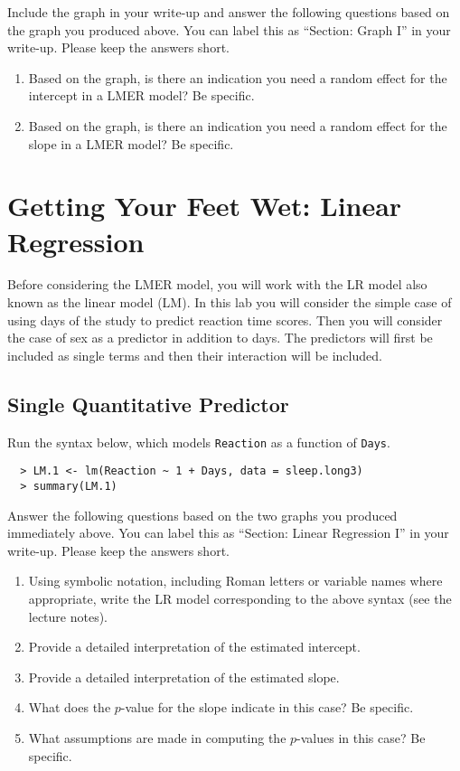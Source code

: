 \documentclass[]{article}
\begin{document}
\noindent Include the graph in your write-up and answer the following questions based on the graph you produced above. You can label this as ``Section: Graph I'' in your write-up. Please keep the
answers short.

\begin{enumerate}[resume]
\item Based on the graph, is there an indication you need a random effect for the intercept in a LMER model? Be specific.
\item Based on the graph, is there an indication you need a random effect for the slope in a LMER model? Be specific.
\end{enumerate}


%
%
\pagebreak
\section*{Getting Your Feet Wet: Linear Regression}

\noindent Before considering the LMER model, you will work with the LR model also known as the linear model (LM). In this lab you will consider the simple case of using days of the study to predict reaction time scores. Then you will consider the case of sex as a predictor in addition to days. The
predictors will first be included as single terms and then their interaction will be included.

\subsection*{Single Quantitative Predictor}
\noindent Run the syntax below, which models \texttt{Reaction} as a function of \texttt{Days}.

\begin{verbatim}
  > LM.1 <- lm(Reaction ~ 1 + Days, data = sleep.long3)
  > summary(LM.1)
\end{verbatim}

\noindent Answer the following questions based on the two graphs you produced immediately above. You can label this as ``Section: Linear Regression I'' in your write-up. Please keep the answers short.

\begin{enumerate}[resume]
\item Using symbolic notation, including Roman letters or variable names where appropriate, write the LR model corresponding to the above syntax (see the lecture notes).
\item Provide a detailed interpretation of the estimated intercept.
\item Provide a detailed interpretation of the estimated slope.
\item What does the $p$-value for the slope indicate in this case? Be specific.
\item What assumptions are made in computing the $p$-values in this case? Be specific.\end{enumerate}
\end{document}
